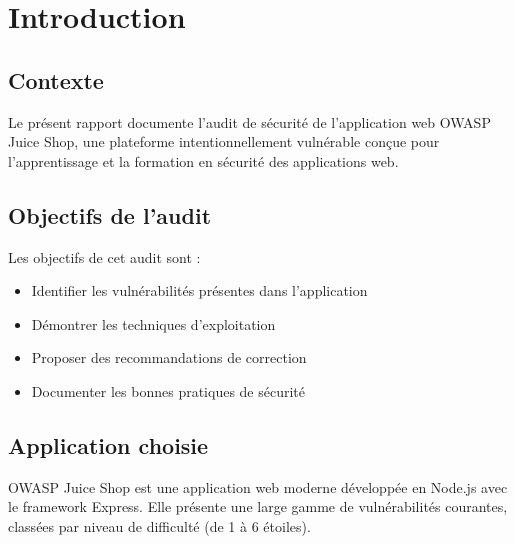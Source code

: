 
\chapter{Introduction}

\section{Contexte}
Le présent rapport documente l'audit de sécurité de l'application web OWASP Juice Shop, une plateforme intentionnellement vulnérable conçue pour l'apprentissage et la formation en sécurité des applications web.

\section{Objectifs de l'audit}
Les objectifs de cet audit sont :
\begin{itemize}
    \item Identifier les vulnérabilités présentes dans l'application
    \item Démontrer les techniques d'exploitation
    \item Proposer des recommandations de correction
    \item Documenter les bonnes pratiques de sécurité
\end{itemize}

\section{Application choisie}
OWASP Juice Shop est une application web moderne développée en Node.js avec le framework Express. Elle présente une large gamme de vulnérabilités courantes, classées par niveau de difficulté (de 1 à 6 étoiles).
